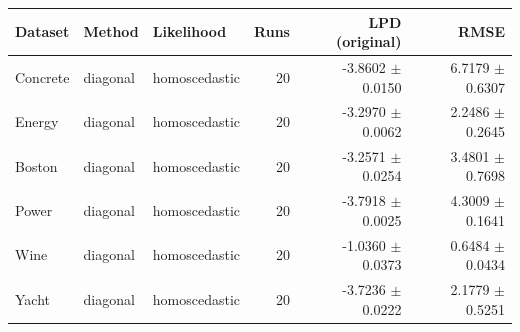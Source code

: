 \begin{tabular}{lllrrr}
\toprule
Dataset & Method & Likelihood & Runs & LPD (original) & RMSE \\
\midrule
Concrete & diagonal & homoscedastic & 20 & -3.8602 $\pm$ 0.0150 & 6.7179 $\pm$ 0.6307 \\
Energy & diagonal & homoscedastic & 20 & -3.2970 $\pm$ 0.0062 & 2.2486 $\pm$ 0.2645 \\
Boston & diagonal & homoscedastic & 20 & -3.2571 $\pm$ 0.0254 & 3.4801 $\pm$ 0.7698 \\
Power & diagonal & homoscedastic & 20 & -3.7918 $\pm$ 0.0025 & 4.3009 $\pm$ 0.1641 \\
Wine & diagonal & homoscedastic & 20 & -1.0360 $\pm$ 0.0373 & 0.6484 $\pm$ 0.0434 \\
Yacht & diagonal & homoscedastic & 20 & -3.7236 $\pm$ 0.0222 & 2.1779 $\pm$ 0.5251 \\
\bottomrule
\end{tabular}
